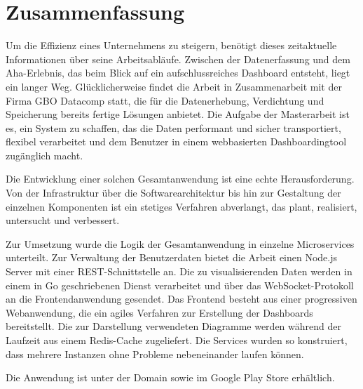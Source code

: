 \chapter*{Zusammenfassung}
\label{chap:zusammenfassung}

Um die Effizienz eines Unternehmens zu steigern, benötigt dieses zeitaktuelle Informationen über seine Arbeitsabläufe.
Zwischen der Datenerfassung und dem Aha-Erlebnis, das beim Blick auf ein aufschlussreiches Dashboard entsteht, liegt ein
langer Weg. Glücklicherweise findet die Arbeit in Zusammenarbeit mit der Firma GBO Datacomp statt, die für die
Datenerhebung, Verdichtung und Speicherung bereits fertige Lösungen anbietet. Die Aufgabe der Masterarbeit
ist es, ein System zu schaffen, das die Daten performant und sicher transportiert, flexibel verarbeitet und dem Benutzer
in einem webbasierten Dashboardingtool zugänglich macht.

Die Entwicklung einer solchen Gesamtanwendung ist eine echte Herausforderung. Von der Infrastruktur
über die Softwarearchitektur bis hin zur Gestaltung der einzelnen Komponenten ist ein stetiges
Verfahren abverlangt, das plant, realisiert, untersucht und verbessert.

Zur Umsetzung wurde die Logik der Gesamtanwendung in einzelne Microservices
unterteilt. Zur Verwaltung der Benutzerdaten bietet die Arbeit einen Node.js Server
mit einer REST-Schnittstelle an. Die zu visualisierenden Daten werden in einem
in Go geschriebenen Dienst verarbeitet und über das WebSocket-Protokoll an die
Frontendanwendung gesendet. Das Frontend besteht aus einer progressiven Webanwendung,
die ein agiles Verfahren zur Erstellung der Dashboards bereitstellt. Die zur Darstellung
verwendeten Diagramme werden während der Laufzeit aus einem Redis-Cache zugeliefert.
Die Services wurden so konstruiert, dass mehrere Instanzen ohne Probleme nebeneinander
laufen können.

Die Anwendung ist unter der Domain  sowie im Google Play Store erhältlich.


